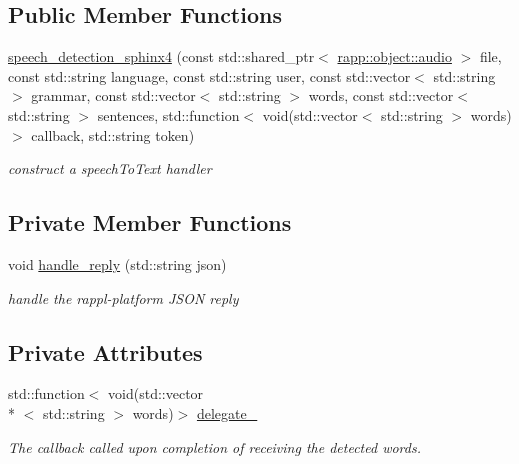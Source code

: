 \subsection*{Public Member Functions}
\begin{DoxyCompactItemize}
\item 
\hyperlink{classrapp_1_1cloud_1_1speech__detection__sphinx4_a10a18f155bd796f1d190367a069393d1}{speech\-\_\-detection\-\_\-sphinx4} (const std\-::shared\-\_\-ptr$<$ \hyperlink{classrapp_1_1object_1_1audio}{rapp\-::object\-::audio} $>$ file, const std\-::string language, const std\-::string user, const std\-::vector$<$ std\-::string $>$ grammar, const std\-::vector$<$ std\-::string $>$ words, const std\-::vector$<$ std\-::string $>$ sentences, std\-::function$<$ void(std\-::vector$<$ std\-::string $>$ words)$>$ callback, std\-::string token)
\begin{DoxyCompactList}\small\item\em construct a speech\-To\-Text handler \end{DoxyCompactList}\end{DoxyCompactItemize}
\subsection*{Private Member Functions}
\begin{DoxyCompactItemize}
\item 
void \hyperlink{classrapp_1_1cloud_1_1speech__detection__sphinx4_a91be47b4583b373bfdc7b63eb5eafaaf}{handle\-\_\-reply} (std\-::string json)
\begin{DoxyCompactList}\small\item\em handle the rappl-\/platform J\-S\-O\-N reply \end{DoxyCompactList}\end{DoxyCompactItemize}
\subsection*{Private Attributes}
\begin{DoxyCompactItemize}
\item 
std\-::function$<$ void(std\-::vector\\*
$<$ std\-::string $>$ words)$>$ \hyperlink{classrapp_1_1cloud_1_1speech__detection__sphinx4_a86ab4eead356c5a2f60e3e627f0f75f7}{delegate\-\_\-}
\begin{DoxyCompactList}\small\item\em The callback called upon completion of receiving the detected words. \end{DoxyCompactList}\end{DoxyCompactItemize}
